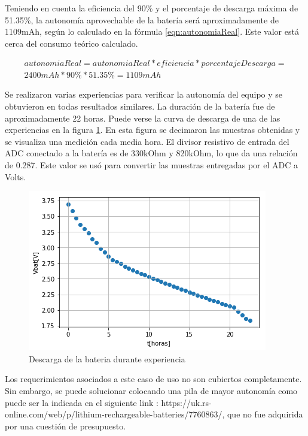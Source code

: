 Teniendo en cuenta la eficiencia del 90\% y el porcentaje de descarga máxima de 51.35\%, la autonomía aprovechable de la batería será aproximadamente de 1109mAh, según lo calculado en la fórmula \ref{eqn:autonomiaReal}.
Este valor está cerca del consumo teórico calculado. 

\begin{equation} \label{eqn:autonomiaReal}
\begin{split}
autonomiaReal = autonomiaReal*eficiencia*porcentajeDescarga = \\ 2400mAh * 90\% * 51.35\% = 1109 mAh
\end{split}
\end{equation}

Se realizaron varias experiencias para verificar la autonomía del equipo y se obtuvieron en todas resultados similares. La duración de la batería fue de aproximadamente 22 horas. Puede verse la curva de descarga de una de las experiencias en la figura \ref{fig:descargaBateria}. En esta figura se decimaron las muestras obtenidas y se visualiza una medición cada media hora. El divisor resistivo de entrada del ADC conectado a la batería es de 330kOhm y 820kOhm, lo que da una relación de 0.287. Este valor se usó para convertir las muestras entregadas por el ADC a Volts.

\begin{figure} [!htpb]
    \centering
    \includegraphics[width=\textwidth]{./Figures/descargaBateria.png}
    \caption{Descarga de la bateria durante experiencia}
    \label{fig:descargaBateria}
\end{figure}

Los requerimientos asociados a este caso de uso no son cubiertos completamente. Sin embargo, se puede solucionar colocando una pila de mayor autonomía como puede ser la indicada en el siguiente link : https://uk.rs-online.com/web/p/lithium-rechargeable-batteries/7760863/, que no fue adquirida por una cuestión de presupuesto.


